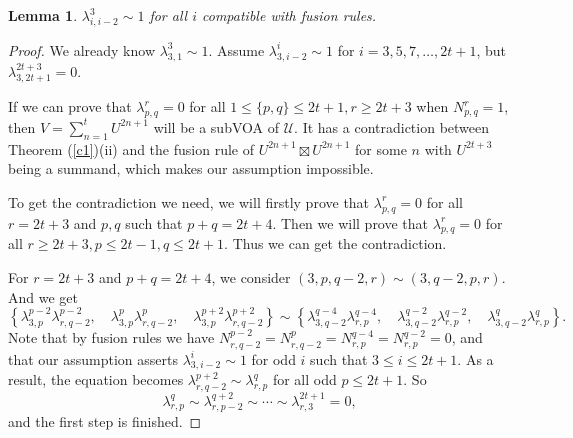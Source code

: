 \documentclass{article}
\newtheorem{lemma}{Lemma}[section]
\begin{document}
\begin{lemma}\label{3,i,i-2}
$\lambda_{i,i-2}^3\sim 1$ for all $i$ compatible with fusion rules.
\end{lemma}
\begin{proof}
We already know $\lambda_{3,1}^3\sim 1$. 
Assume $\lambda_{3,i-2}^i\sim 1$ for $i=3, 5,7,\dots,2t+1$,
but $\lambda_{3,2t+1}^{2t+3}=0$.

If we can prove that $\lambda_{p,q}^{r}=0$ for all 
$1\leq \{p,q\}\leq 2t+1,r\geq 2t+3$ when $N_{p,q}^r=1$, 
then $V=\sum_{n=1}^{t}U^{2n+1}$ will be a subVOA of $\mathcal{U}$.
It has a contradiction between Theorem (\ref{c1})(ii) and the fusion rule of $U^{2n+1}\boxtimes U^{2n+1}$ for some $n$ with $U^{2t+3}$ being a summand, 
which makes our assumption impossible.

To get the contradiction we need, 
we will firstly prove that $\lambda_{p,q}^{r}=0$ for all $r=2t+3$ and $p,q$ such that $p+q=2t+4$.
Then we will prove that $\lambda_{p,q}^r=0$ for all $r\geq 2t+3,p\leq 2t-1,q\leq 2t+1$.
Thus we can get the contradiction.

For $r=2t+3$ and $p+q=2t+4$,
we consider $(3,p,q-2,r)\sim (3,q-2,p,r)$.
And we get
$$
\left\{
\lambda_{3,p}^{p-2}\lambda_{r,q-2}^{p-2},\quad
\lambda_{3,p}^{p}\lambda_{r,q-2}^{p},\quad
\lambda_{3,p}^{p+2}\lambda_{r,q-2}^{p+2}
\right\}
\sim
\left\{
\lambda_{3,q-2}^{q-4}\lambda_{r,p}^{q-4},\quad
\lambda_{3,q-2}^{q-2}\lambda_{r,p}^{q-2},\quad
\lambda_{3,q-2}^{q}\lambda_{r,p}^{q}\right\}.
$$
Note that by fusion rules we have
$N_{r,q-2}^{p-2}=N_{r,q-2}^{p}=N_{r,p}^{q-4}=N_{r,p}^{q-2}=0$,
and that our assumption asserts $\lambda_{3,i-2}^{i}\sim 1$ for odd $i$ such that $3\leq i \leq 2t+1$.
As a result, the equation becomes
$\lambda_{r,q-2}^{p+2}
\sim\lambda_{r,p}^{q}$ for all odd $p\leq 2t+1$.
So 
$$\lambda_{r,p}^{q}
\sim\lambda_{r,p-2}^{q+2}\sim\cdots\sim \lambda_{r,3}^{2t+1}=0,$$
and the first step is finished.




\end{proof}
\end{document}
